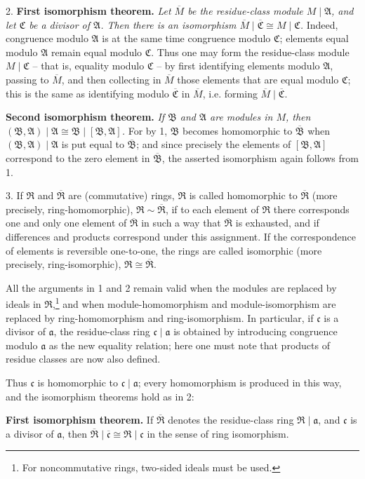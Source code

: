 \documentclass[11pt]{article}
\providecommand{\mR}{\mathfrak{R}}
\providecommand{\mA}{\mathfrak{A}}
\providecommand{\mB}{\mathfrak{B}}
\providecommand{\mC}{\mathfrak{C}}
\providecommand{\ma}{\mathfrak{a}}
\providecommand{\mc}{\mathfrak{c}}
\begin{document}
2. \textbf{First isomorphism theorem.} \emph{Let $\overline M$ be the residue-class module $M\mid\mA$, and let $\mC$ be a divisor of $\mA$. Then there is an isomorphism $\overline M\mid\overline{\mC}\cong M\mid\mC$.} Indeed, congruence modulo $\mA$ is at the same time congruence modulo $\mC$; elements equal modulo $\mA$ remain equal modulo $\mC$. Thus one may form the residue-class module $M\mid\mC$ -- that is, equality modulo $\mC$ -- by first identifying elements modulo $\mA$, passing to $\overline M$, and then collecting in $\overline M$ those elements that are equal modulo $\mC$; this is the same as identifying modulo $\overline{\mC}$ in $\overline M$, i.e. forming $\overline M\mid\overline{\mC}$.

\textbf{Second isomorphism theorem.} \emph{If $\mB$ and $\mA$ are modules in $M$, then $(\mB,\mA)\mid\mA\cong\mB\mid[\mB,\mA]$.} For by 1, $\mB$ becomes homomorphic to $\overline{\mB}$ when $(\mB,\mA)\mid\mA$ is put equal to $\overline{\mB}$; and since precisely the elements of $[\mB,\mA]$ correspond to the zero element in $\overline{\mB}$, the asserted isomorphism again follows from 1.

3. If $\mR$ and $\overline{\mR}$ are (commutative) rings, $\mR$ is called homomorphic to $\overline{\mR}$ (more precisely, ring-homomorphic), $\mR\sim\overline{\mR}$, if to each element of $\mR$ there corresponds one and only one element of $\overline{\mR}$ in such a way that $\overline{\mR}$ is exhausted, and if differences and products correspond under this assignment. If the correspondence of elements is reversible one-to-one, the rings are called isomorphic (more precisely, ring-isomorphic), $\mR\cong\overline{\mR}$.

All the arguments in 1 and 2 remain valid when the modules are replaced by ideals in $\mR$,\footnote{For noncommutative rings, two-sided ideals must be used.} and when module-homomorphism and module-isomorphism are replaced by ring-homomorphism and ring-isomorphism. In particular, if $\mc$ is a divisor of $\ma$, the residue-class ring $\mc\mid\ma$ is obtained by introducing congruence modulo $\ma$ as the new equality relation; here one must note that products of residue classes are now also defined.

Thus $\mc$ is homomorphic to $\mc\mid\ma$; every homomorphism is produced in this way, and the isomorphism theorems hold as in 2:

\textbf{First isomorphism theorem.} If $\overline{\mR}$ denotes the residue-class ring $\mR\mid\ma$, and $\mc$ is a divisor of $\ma$, then $\overline{\mR}\mid\overline{\mc}\cong\mR\mid\mc$ in the sense of ring isomorphism.
\end{document}
